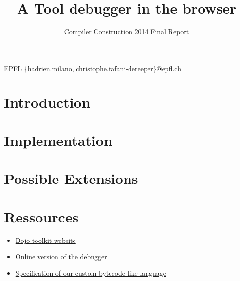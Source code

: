 \documentclass[nocopyrightspace,11pt,authoryear,preprint]{sigplanconf}
\begin{document}


\title{A Tool debugger in the browser}
\subtitle{Compiler Construction 2014 Final Report}

           {EPFL}
           {\{hadrien.milano, christophe.tafani-dereeper\}@epfl.ch}

\maketitle

\section{Introduction}


%

\section{Implementation}


\section{Possible Extensions}


\section{Ressources}
\begin{itemize}
\item \href{http://dojotoolkit.org}{Dojo toolkit website}
\item \href{http://vps.christophetd.fr/tool_dbg/}{Online version of the debugger}
\item \href{https://github.com/hmil/tool_dbg/blob/master/ASM_definition.md}{Specification of our custom bytecode-like language}

\end{itemize}
\end{document}
